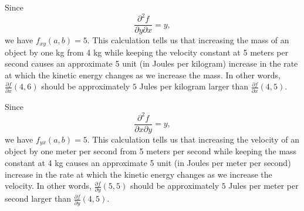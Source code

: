 \begin{exercises}
\begin{exerciseSolution}
\item Since  
\[\frac{ \partial^2 f}{\partial y \partial x}  = y,\]
we have $f_{xy}(a,b) = 5$.  This calculation tells us that increasing the mass of an object by one kg from 4 kg while keeping the velocity constant at 5 meters per second causes an approximate 5 unit (in Joules per kilogram) increase in the rate at which the kinetic energy changes as we increase the mass. In other words, $\frac{\partial f}{\partial x}(4,6)$ should be approximately $5$ Jules per kilogram larger than $\frac{\partial f}{\partial x}(4,5)$.  

\item Since  
\[\frac{ \partial^2 f}{\partial x \partial y}  = y,\]
we have $f_{yx}(a,b) = 5$.  This calculation tells us that increasing the velocity of an object by one meter per second from 5 meters per second while keeping the mass constant at 4 kg causes an approximate 5 unit (in Joules per meter per second) increase in the rate at which the kinetic energy changes as we increase the velocity. In other words, $\frac{\partial f}{\partial y}(5,5)$ should be approximately $5$ Jules per meter per second larger than $\frac{\partial f}{\partial y}(4,5)$.  
\ea
\end{exerciseSolution}

\end{exercises}
\afterexercises
